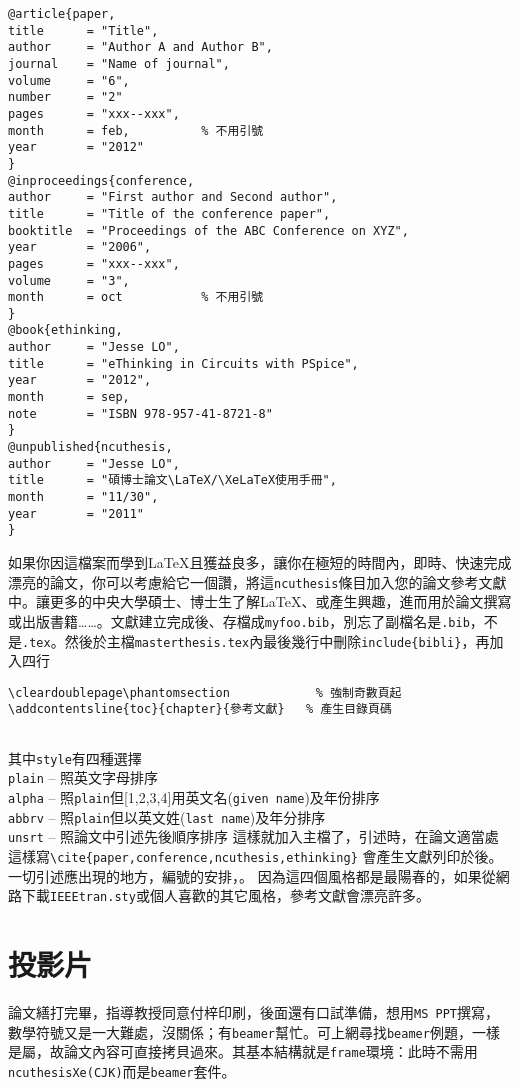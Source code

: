 \begin{Verbatim}[frame=single,firstline=1,lastline=32,rulecolor=\color{red},label=Typing up myfoo.bib]
@article{paper,
title      = "Title",
author     = "Author A and Author B",
journal    = "Name of journal",
volume     = "6",
number     = "2"
pages      = "xxx--xxx",
month      = feb,          % 不用引號
year       = "2012"
}
@inproceedings{conference,
author     = "First author and Second author",
title      = "Title of the conference paper",
booktitle  = "Proceedings of the ABC Conference on XYZ",
year       = "2006",
pages      = "xxx--xxx",
volume     = "3",
month      = oct           % 不用引號
}
@book{ethinking,
author     = "Jesse LO",
title      = "eThinking in Circuits with PSpice",
year       = "2012",
month      = sep,
note       = "ISBN 978-957-41-8721-8"
}
@unpublished{ncuthesis,
author     = "Jesse LO",
title      = "碩博士論文\LaTeX/\XeLaTeX使用手冊",
month      = "11/30",          
year       = "2011"
}
\end{Verbatim}
如果你因這檔案而學到\LaTeX{}且獲益良多，讓你在極短的時間內，即時、快速完成漂亮的論文，你可以考慮給它一個讚，將這{\tt ncuthesis}條目加入您的論文參考文獻中。讓更多的中央大學碩士、博士生了解\LaTeX、或產生興趣，進而用於論文撰寫或出版書籍\ldots \ldots。文獻建立完成後、存檔成{\tt myfoo.bib}，別忘了副檔名是{\color{red}\tt .bib}，不是{\color{red}\tt .tex}。然後於主檔{\tt masterthesis.tex}內最後幾行中刪除\verb+include{bibli}+，再加入四行
\begin{Verbatim}[frame=single,rulecolor=\color{red},label=Add this]
\cleardoublepage\phantomsection            % 強制奇數頁起
\addcontentsline{toc}{chapter}{參考文獻}   % 產生目錄頁碼


\end{Verbatim}
其中{\tt style}有四種選擇\\ 
{\tt plain} -- 照英文字母排序\\
{\tt alpha} -- 照{\tt plain}但[1,2,3,4]用英文名({\tt given name})及年份排序\\
{\tt abbrv} -- 照{\tt plain}但以英文姓({\tt last name})及年分排序\\
{\tt unsrt} -- 照論文中引述先後順序排序
這樣就加入主檔了，引述時，在論文適當處這樣寫\verb+\cite{paper,conference,ncuthesis,ethinking}+
會產生文獻列印於後。一切引述應出現的地方，編號的安排，。
因為這四個風格都是最陽春的，如果從網路下載{\tt IEEEtran.sty}或個人喜歡的其它風格，參考文獻會漂亮許多。

\section{投影片}
論文繕打完畢，指導教授同意付梓印刷，後面還有口試準備，想用{\tt MS PPT}撰寫，數學符號又是一大難處，沒關係；有{\tt beamer}幫忙。可上網尋找{\tt beamer}例題，一樣是屬，故論文內容可直接拷貝過來。其基本結構就是{\tt frame}環境：此時不需用{\tt ncuthesisXe(CJK)}而是{\tt beamer}套件。

